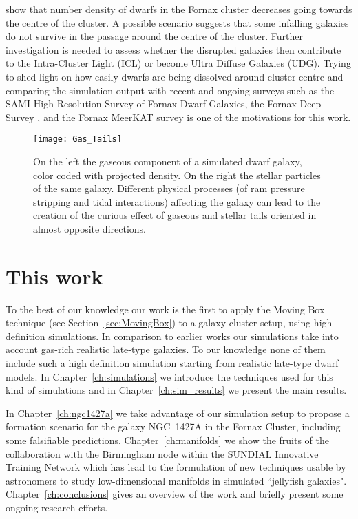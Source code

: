 \citet{Venhola2018} show that number density of dwarfs in the Fornax cluster decreases going towards the centre of the cluster.
A possible scenario suggests that some infalling galaxies do not survive in the passage around the centre of the cluster.
Further investigation is needed to assess  whether the disrupted galaxies then contribute to the Intra-Cluster Light (ICL) or become Ultra Diffuse Galaxies (UDG).
Trying to shed light on how easily dwarfs are being dissolved around cluster centre and comparing the simulation output with recent and ongoing surveys such as the SAMI High Resolution Survey of Fornax Dwarf Galaxies, \citep{Owers2019, Scott2018}
the Fornax Deep Survey \citep{Venhola2018}, and the Fornax MeerKAT survey \citep{Loni2021} is one of the motivations for this work.



\begin{figure}
  \centering
  \texttt{[image: Gas\_Tails]}
  \caption{On the left the gaseous component of a simulated dwarf galaxy, color coded with projected density.
    On the right the stellar particles of the same galaxy.
   Different physical processes (of ram pressure stripping and tidal interactions) affecting the galaxy can lead to the creation of the curious effect of gaseous and stellar tails oriented in almost opposite directions.}
  \label{fig:tails}
\end{figure}


\section{This work}
To the best of our knowledge our work is the first to apply the Moving Box technique (see Section~\ref{sec:MovingBox}) to a galaxy cluster setup, using high definition simulations.
In comparison to earlier works our simulations take into account gas-rich realistic late-type galaxies.
To our knowledge none of them include such a high definition simulation starting from realistic late-type dwarf models.
In Chapter~\ref{ch:simulations} we introduce the techniques used for this kind of simulations and in Chapter~\ref{ch:sim_results} we present the main results.

In Chapter~\ref{ch:ngc1427a} \citep{Mastropietro2021} we take advantage of our simulation setup to propose a formation scenario for the galaxy NGC~1427A in the Fornax Cluster, including some falsifiable predictions.
Chapter~\ref{ch:manifolds} \citep{Canducci2021} we show the fruits of the collaboration with the Birmingham node within the SUNDIAL Innovative Training Network which has lead to the formulation of new techniques usable by astronomers to study low-dimensional manifolds in simulated ``jellyfish galaxies".
Chapter~\ref{ch:conclusions} gives an overview of the work and briefly present some ongoing research efforts.


